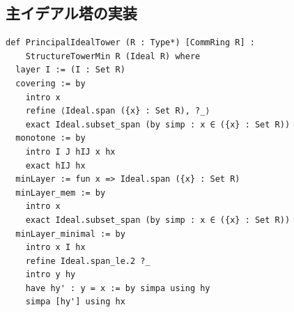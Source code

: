 \documentclass[a4paper,11pt,ja=standard]{bxjsarticle}
\theoremstyle{definition}
\begin{document}
\subsection{主イデアル塔の実装}

\begin{lstlisting}[style=leanstyle, caption=主イデアル塔]
def PrincipalIdealTower (R : Type*) [CommRing R] :
    StructureTowerMin R (Ideal R) where
  layer I := (I : Set R)
  covering := by
    intro x
    refine ⟨Ideal.span ({x} : Set R), ?_⟩
    exact Ideal.subset_span (by simp : x ∈ ({x} : Set R))
  monotone := by
    intro I J hIJ x hx
    exact hIJ hx
  minLayer := fun x => Ideal.span ({x} : Set R)
  minLayer_mem := by
    intro x
    exact Ideal.subset_span (by simp : x ∈ ({x} : Set R))
  minLayer_minimal := by
    intro x I hx
    refine Ideal.span_le.2 ?_
    intro y hy
    have hy' : y = x := by simpa using hy
    simpa [hy'] using hx
\end{lstlisting}
\end{document}
